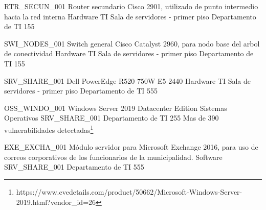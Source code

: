 \documentclass[11pt]{utalcaDoc}
\begin{document}
\informationResource
{RTR\_SECUN\_001}
{Router secundario Cisco 2901, utilizado de punto intermedio hacia la red interna}
{Hardware TI}
{Sala de servidores - primer piso}
{Departamento de TI}
{1}{5}{5}
{
	\threatResourceLost
	\threatHumanIntervention
	\threatRemoteIntervention
	\threatNaturalDisaster
	\threatHumanDisaster
}

\informationResource
{SWI\_NODES\_001}
{Switch general Cisco Catalyst 2960, para nodo base del arbol de conectividad}
{Hardware TI}
{Sala de servidores - primer piso}
{Departamento de TI}
{1}{5}{5}
{
	\threatResourceLost
	\threatHumanIntervention
	\threatRemoteIntervention
	\threatNaturalDisaster
	\threatHumanDisaster
}

\informationResource
{SRV\_SHARE\_001}
{Dell PowerEdge R520 750W E5 2440}
{Hardware TI}
{Sala de servidores - primer piso}
{Departamento de TI}
{5}{5}{5}
{
	\threatHumanIntervention
	\threatRemoteIntervention
	\threatNaturalDisaster
	\threatHumanDisaster
	\threatInterest
}


\informationResource
{OSS\_WINDO\_001}
{Windows Server 2019 Datacenter Edition}
{Sistemas Operativos}
{SRV_SHARE_001}
{Departamento de TI}
{2}{5}{5}
{
	Mas de 390 vulnerabilidades detectadas\footnote{https://www.cvedetails.com/product/50662/Microsoft-Windows-Server-2019.html?vendor_id=26}\\
	\threatHumanIntervention
	\threatRemoteIntervention
}


\informationResource
{EXE\_EXCHA\_001}
{Módulo servidor para Microsoft Exchange 2016, para uso de correos corporativos de los funcionarios de la municipalidad.}
{Software}
{SRV_SHARE_001}
{Departamento de TI}
{5}{5}{5}
{
	\threatHumanIntervention
	\threatRemoteIntervention
	\threatInterest
}
\end{document}
